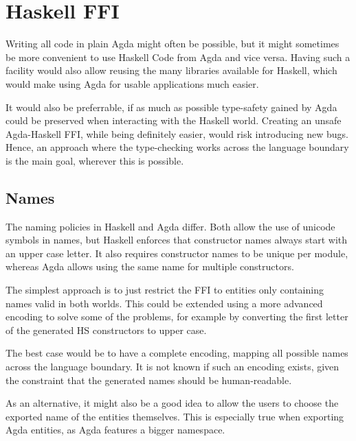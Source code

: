 \documentclass[12pt, a4paper, twoside]{report}
\begin{document}
\section{Haskell FFI}
\label{sec:prop:hs-ffi}
Writing all code in plain Agda might often be possible, but it might sometimes be more
convenient to use Haskell Code from Agda and vice versa. Having such a facility would
also allow reusing the many libraries available for Haskell, which would make using Agda
for usable applications much easier.

It would also be preferrable, if as much as possible type-safety gained by Agda could be
preserved when interacting with the Haskell world. Creating an unsafe Agda-Haskell
FFI, while being definitely easier, would risk introducing new bugs. Hence, an approach
where the type-checking works across the language boundary is the main goal, wherever
this is possible.



\subsection{Names}
The naming policies in Haskell and Agda differ. Both allow the use of unicode symbols in names, but Haskell enforces
that constructor names always start with an upper case letter. It also requires constructor names to be unique
per module, whereas Agda allows using the same name for multiple constructors.

The simplest approach is to just restrict the FFI to entities only containing names valid in both worlds.
This could be extended using a more advanced encoding to solve some of the problems, for example
by converting the first letter of the generated HS constructors to upper case.

The best case would be to have a complete encoding, mapping all possible names across the language boundary. It is not known
if such an encoding exists, given the constraint that the generated names should be human-readable.

As an alternative, it might also be a good idea to allow the users to choose the exported name of the entities themselves.
This is especially true when exporting Agda entities, as Agda features a bigger namespace.
\end{document}

